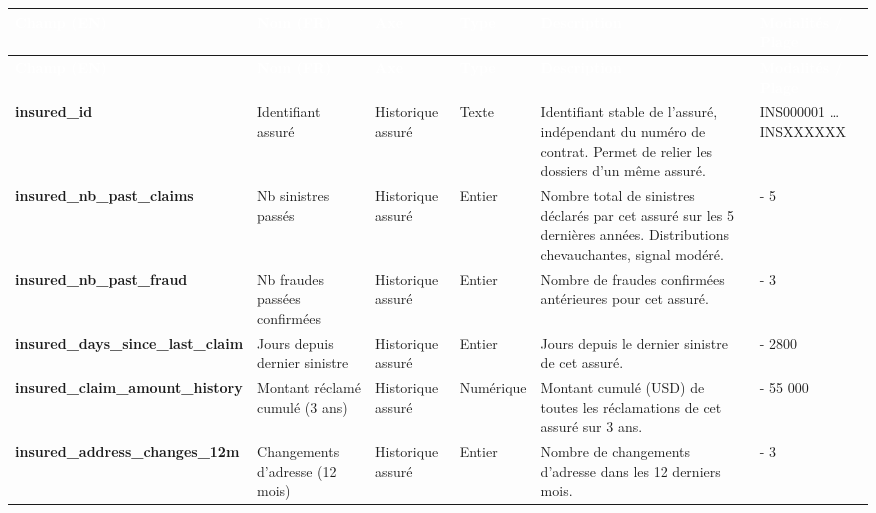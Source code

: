 \begin{scriptsize}
\renewcommand{\arraystretch}{1.3}
\begin{longtable}{|>{\centering\arraybackslash}m{2.4cm}|>{\centering\arraybackslash}m{1.9cm}|>{\centering\arraybackslash}m{1.9cm}|>{\centering\arraybackslash}m{1.7cm}|>{\centering\arraybackslash}m{5cm}|>{\centering\arraybackslash}m{2.5cm}|}
    \hline
    \rowcolor{accenture}
    \textcolor{white}{\textbf{Champ (EN)}} & \textcolor{white}{\textbf{Nom (FR)}} & \textcolor{white}{\textbf{Axe}} & \textcolor{white}{\textbf{Type}} & \textcolor{white}{\textbf{Description}} & \textcolor{white}{\textbf{Modalités / Plage}} \\
    \hline
    \endfirsthead
    \hline
    \rowcolor{accenture}
    \textcolor{white}{\textbf{Champ (EN)}} & \textcolor{white}{\textbf{Nom (FR)}} & \textcolor{white}{\textbf{Axe}} & \textcolor{white}{\textbf{Type}} & \textcolor{white}{\textbf{Description}} & \textcolor{white}{\textbf{Modalités / Plage}} \\
    \hline
    \endhead
    \hline
    \endfoot
    \endlastfoot
    \rowcolor{axehist} \textbf{insured\_id} & Identifiant assuré & Historique assuré & Texte & Identifiant stable de l'assuré, indépendant du numéro de contrat. Permet de relier les dossiers d'un même assuré. & INS000001 … INSXXXXXX \\
    \hline
    \rowcolor{axehist} \textbf{insured\_nb\_past\_claims} & Nb sinistres passés & Historique assuré & Entier & Nombre total de sinistres déclarés par cet assuré sur les 5 dernières années. Distributions chevauchantes, signal modéré. & 0 - 5 \\
    \hline
    \rowcolor{axehist} \textbf{insured\_nb\_past\_fraud} & Nb fraudes passées confirmées & Historique assuré & Entier & Nombre de fraudes confirmées antérieures pour cet assuré. & 0 - 3 \\
    \hline
    \rowcolor{axehist} \textbf{insured\_days\_since\_last\_claim} & Jours depuis dernier sinistre & Historique assuré & Entier & Jours depuis le dernier sinistre de cet assuré. & 60 - 2800 \\
    \hline
    \rowcolor{axehist} \textbf{insured\_claim\_amount\_history} & Montant réclamé cumulé (3 ans) & Historique assuré & Numérique & Montant cumulé (USD) de toutes les réclamations de cet assuré sur 3 ans. & 0 - 55 000 \\
    \hline
    \rowcolor{axehist} \textbf{insured\_address\_changes\_12m} & Changements d'adresse (12 mois) & Historique assuré & Entier & Nombre de changements d'adresse dans les 12 derniers mois. & 0 - 3 \\

\end{longtable}
\end{scriptsize}

